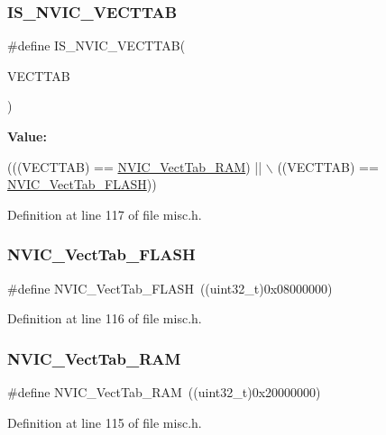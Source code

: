 \subsubsection{\texorpdfstring{I\+S\+\_\+\+N\+V\+I\+C\+\_\+\+V\+E\+C\+T\+T\+AB}{IS\_NVIC\_VECTTAB}}
{\footnotesize\ttfamily \#define I\+S\+\_\+\+N\+V\+I\+C\+\_\+\+V\+E\+C\+T\+T\+AB(\begin{DoxyParamCaption}\item[{}]{V\+E\+C\+T\+T\+AB }\end{DoxyParamCaption})}

{\bfseries Value\+:}
\begin{DoxyCode}
(((VECTTAB) == \hyperlink{group___vector___table___base_ga8be8181cc3e5d42f6204af306ab50f80}{NVIC\_VectTab\_RAM}) || \(\backslash\)
                                  ((VECTTAB) == \hyperlink{group___vector___table___base_gafbf92fd28a1090b2aa49732ebd5704b5}{NVIC\_VectTab\_FLASH}))
\end{DoxyCode}


Definition at line 117 of file misc.\+h.

\mbox{\label{group___vector___table___base_gafbf92fd28a1090b2aa49732ebd5704b5}} 
\subsubsection{\texorpdfstring{N\+V\+I\+C\+\_\+\+Vect\+Tab\+\_\+\+F\+L\+A\+SH}{NVIC\_VectTab\_FLASH}}
{\footnotesize\ttfamily \#define N\+V\+I\+C\+\_\+\+Vect\+Tab\+\_\+\+F\+L\+A\+SH~((uint32\+\_\+t)0x08000000)}



Definition at line 116 of file misc.\+h.

\mbox{\label{group___vector___table___base_ga8be8181cc3e5d42f6204af306ab50f80}} 
\subsubsection{\texorpdfstring{N\+V\+I\+C\+\_\+\+Vect\+Tab\+\_\+\+R\+AM}{NVIC\_VectTab\_RAM}}
{\footnotesize\ttfamily \#define N\+V\+I\+C\+\_\+\+Vect\+Tab\+\_\+\+R\+AM~((uint32\+\_\+t)0x20000000)}



Definition at line 115 of file misc.\+h.

